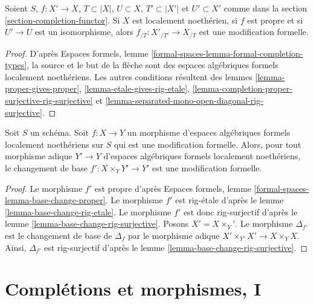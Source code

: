 \begin{lemma}
\label{lemma-modification-gives-formal-modification}
Soient $S$, $f : X' \to X$, $T \subset |X|$, $U \subset X$,
$T' \subset |X'|$ et $U' \subset X'$ comme dans la
section \ref{section-completion-functor}.
Si $X$ est localement noethérien, si $f$ est propre et si $U' \to U$ est un
isomorphisme, alors $f_{/T} : X'_{/T'} \to X_{/T}$ est une modification formelle.
\end{lemma}

\begin{proof}
D'après Espaces formels, lemme \ref{formal-spaces-lemma-formal-completion-types},
la source et le but de la flèche sont des espaces algébriques formels
localement noethériens.
Les autres conditions résultent des
lemmes \ref{lemma-proper-gives-proper},
\ref{lemma-etale-gives-rig-etale},
\ref{lemma-completion-proper-surjective-rig-surjective} et
\ref{lemma-separated-mono-open-diagonal-rig-surjective}.
\end{proof}

\begin{lemma}
\label{lemma-base-change-formal-modification}
Soit $S$ un schéma. Soit $f : X \to Y$ un morphisme d'espaces algébriques
formels localement noethériens sur $S$ qui est une modification formelle.
Alors, pour tout morphisme adique $Y' \to Y$ d'espaces algébriques formels
localement noethériens, le changement de base $f' : X \times_Y Y' \to Y'$
est une modification formelle.
\end{lemma}

\begin{proof}
Le morphisme $f'$ est propre d'après
Espaces formels, lemme \ref{formal-spaces-lemma-base-change-proper}.
Le morphisme $f'$ est rig-étale d'après le
lemme \ref{lemma-base-change-rig-etale}.
Le morphisme $f'$ est donc rig-surjectif d'après le
lemme \ref{lemma-base-change-rig-surjective}. Posons $X' = X \times_ Y'$.
Le morphisme $\Delta_{f'}$ est le changement de base de
$\Delta_f$ par le morphisme adique $X' \times_{Y'} X' \to X \times_Y X$.
Ainsi, $\Delta_{f'}$ est rig-surjectif d'après le
lemme \ref{lemma-base-change-rig-surjective}.
\end{proof}









\section{Complétions et morphismes, I}
\label{section-completion-and-morphisms}

